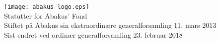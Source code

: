 \documentclass{article}
\begin{document}
\begin{center}
  \texttt{[image: abakus\_logo.eps]} \\
  \Large{Statutter for Abakus' Fond} \\
  \vspace{0.4cm}
  \normalsize{Stiftet på Abakus sin ekstraordinære generalforsamling 11. mars 2013 \\
              Sist endret ved ordinær generalforsamling 23. februar 2018}
\end{center}

\newpage
\tableofcontents
\newpage


\end{document}
